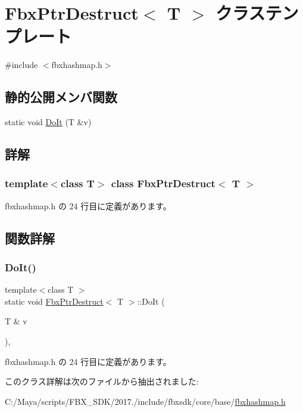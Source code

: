 \hypertarget{class_fbx_ptr_destruct}{}\section{Fbx\+Ptr\+Destruct$<$ T $>$ クラステンプレート}
\label{class_fbx_ptr_destruct}


{\ttfamily \#include $<$fbxhashmap.\+h$>$}

\subsection*{静的公開メンバ関数}
\begin{DoxyCompactItemize}
\item 
static void \hyperlink{class_fbx_ptr_destruct_a32636050fc3eceb289da67817450db7e}{Do\+It} (T \&v)
\end{DoxyCompactItemize}


\subsection{詳解}
\subsubsection*{template$<$class T$>$\newline
class Fbx\+Ptr\+Destruct$<$ T $>$}



 fbxhashmap.\+h の 24 行目に定義があります。



\subsection{関数詳解}
\mbox{\label{class_fbx_ptr_destruct_a32636050fc3eceb289da67817450db7e}} 
\subsubsection{\texorpdfstring{Do\+It()}{DoIt()}}
{\footnotesize\ttfamily template$<$class T $>$ \\
static void \hyperlink{class_fbx_ptr_destruct}{Fbx\+Ptr\+Destruct}$<$ T $>$\+::Do\+It (\begin{DoxyParamCaption}\item[{T \&}]{v }\end{DoxyParamCaption})\hspace{0.3cm}{\ttfamily [inline]}, {\ttfamily [static]}}



 fbxhashmap.\+h の 24 行目に定義があります。



このクラス詳解は次のファイルから抽出されました\+:\begin{DoxyCompactItemize}
\item 
C\+:/\+Maya/scripts/\+F\+B\+X\+\_\+\+S\+D\+K/2017./include/fbxsdk/core/base/\hyperlink{fbxhashmap_8h}{fbxhashmap.\+h}\end{DoxyCompactItemize}
